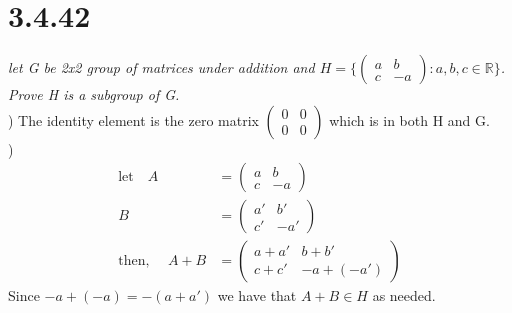 \documentclass[a4paper, 11pt]{article}
\begin{document}
\section*{3.4.42}
\textit{let G be 2x2 group of matrices under addition and $H = \Bigg\{
	\begin{pmatrix}
		a & b \\ 
		c & -a
	\end{pmatrix}
	: a,b,c \in \mathbb{R} \Bigg\}$. Prove H is a subgroup of G.} \\

) The identity element is the zero matrix $
\begin{pmatrix}
	0 & 0 \\ 
	0 & 0
\end{pmatrix}$ which is in both H and G. \\

)
	\begin{align*}
		\text{let} \quad A &= 
		\begin{pmatrix}
			a  & b \\ 
			c & -a 
		\end{pmatrix} \\ 
		B &= 
		\begin{pmatrix}
			a' & b' \\ 
			c' & -a'
		\end{pmatrix} \\ 
		\text{then, } \quad A+B &= 
		\begin{pmatrix}
			a+a' & b+b' \\ 
			c+c' & -a + (-a')
		\end{pmatrix}
	\end{align*} 
Since $-a + (-a)= -(a+a')$ we have that $A+B \in H$ as needed. \\ 
\end{document}
